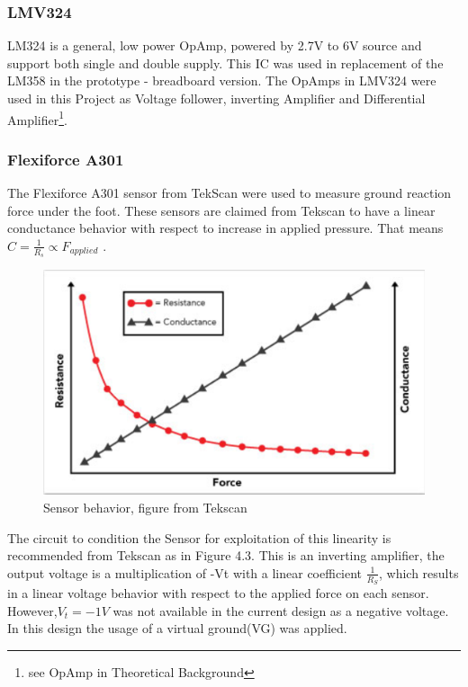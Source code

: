 \documentclass[12 pt, a4paper]{thesis}
\begin{document}
\subsubsection*{LMV324}
LM324 is a general, low power OpAmp, powered by 2.7V to 6V source and support both single and double supply. This IC was used in replacement of the LM358 in the prototype - breadboard version. The OpAmps in LMV324 were used in this Project as Voltage follower, inverting Amplifier and Differential Amplifier\footnote{see OpAmp in Theoretical Background}. 
\subsubsection{Flexiforce A301}
The Flexiforce A301 sensor from TekScan were used to measure ground reaction force under the foot.  These sensors are claimed from Tekscan to have a linear conductance behavior with respect to increase in applied pressure. That means $C=\frac{1}{R_s}\propto F_{applied}$ \cite{silverA301}.\\
\begin{figure}[hbt!]
\begin{center}
\includegraphics[width=120mm]{FlexA301CR.png}
\end{center}
\caption{Sensor behavior, figure from Tekscan\cite{silverA301}}
\end{figure}
The circuit to condition the Sensor for exploitation of this linearity is recommended from Tekscan as in Figure 4.3. This is an inverting amplifier, the output voltage is a multiplication of -Vt with a linear coefficient $\frac{1}{R_S}$, which results in a linear voltage behavior with respect to the applied force on each sensor. 
\\However,$V_t=-1V$ was not available in the current design as a negative voltage. In this design the usage of a virtual ground(VG) was applied.\\
\end{document}
